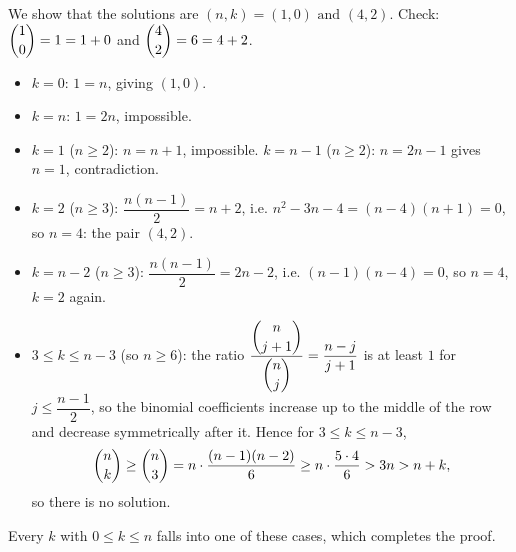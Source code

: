 We show that the solutions are $\boxed{(n,k)=(1,0)\text{ and }(4,2)}$. Check: $\dbinom10=1=1+0$ and $\dbinom42=6=4+2$.
\begin{itemize}
\item $k=0$: $1=n$, giving $(1,0)$.
\item $k=n$: $1=2n$, impossible.
\item $k=1$ ($n\ge2$): $n=n+1$, impossible. $k=n-1$ ($n\ge2$): $n=2n-1$ gives $n=1$, contradiction.
\item $k=2$ ($n\ge3$): $\dfrac{n(n-1)}{2}=n+2$, i.e. $n^2-3n-4=(n-4)(n+1)=0$, so $n=4$: the pair $(4,2)$.
\item $k=n-2$ ($n\ge3$): $\dfrac{n(n-1)}{2}=2n-2$, i.e. $(n-1)(n-4)=0$, so $n=4$, $k=2$ again.
\item $3\le k\le n-3$ (so $n\ge6$): the ratio $\dfrac{\dbinom n{j+1}}{\dbinom nj}=\dfrac{n-j}{j+1}$ is at least $1$ for $j\le\dfrac{n-1}{2}$, so the binomial coefficients increase up to the middle of the row and decrease symmetrically after it. Hence for $3\le k\le n-3$,
\[
\dbinom nk\ge\dbinom n3=n\cdot\dfrac{(n-1)(n-2)}{6}\ge n\cdot\dfrac{5\cdot4}{6}>3n>n+k ,
\]
so there is no solution.
\end{itemize}
Every $k$ with $0\le k\le n$ falls into one of these cases, which completes the proof.

